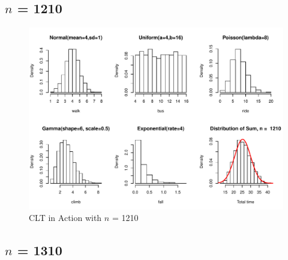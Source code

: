 \documentclass[11pt,letter]{article}\usepackage[]{graphicx}\usepackage[]{color}
\makeatletter
\def\maxwidth{ %
  \ifdim\Gin@nat@width>\linewidth
    \linewidth
  \else
    \Gin@nat@width
  \fi
}
\newenvironment{knitrout}{}{} %
\makeatother
\begin{document}
\subsection{$n$ = 1210}

\begin{knitrout}
\color{fgcolor}\begin{figure}[h]

{\centering \includegraphics[width=\maxwidth]{figure/n-1210-1} 

}

\caption[CLT in Action with ]{CLT in Action with $n$ = 1210}\label{fig:n-1210}
\end{figure}


\end{knitrout}
\newpage
\subsection{$n$ = 1310}
\end{document}
